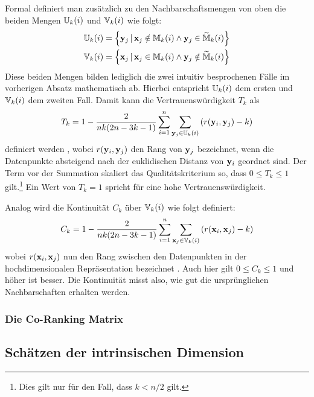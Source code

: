 Formal definiert man zusätzlich zu den Nachbarschaftsmengen von oben die beiden Mengen
$\mathbb{U}_k(i)$ und $\mathbb{V}_k(i)$ wie folgt:
\begin{gather}
	\mathbb{U}_k(i) =  \left\{ \mathbf{y}_j\, |\, \mathbf{x}_j \notin \mathbb{M}_k(i) \land \mathbf{y}_j \in \widetilde{\mathbb{M}}_k(i) \right\} \\
	\mathbb{V}_k(i) =  \left\{ \mathbf{x}_j\, |\, \mathbf{x}_j \in \mathbb{M}_k(i) \land \mathbf{y}_j \notin \widetilde{\mathbb{M}}_k(i) \right\}
\end{gather}
Diese beiden Mengen bilden lediglich die zwei intuitiv besprochenen Fälle im vorherigen Absatz mathematisch ab. Hierbei entspricht $\mathbb{U}_k(i)$ dem ersten und $\mathbb{V}_k(i)$ dem zweiten Fall.
Damit kann die Vertrauenswürdigkeit $T_k$ als
\begin{equation}
	T_k = 1 - \frac{2}{nk(2n - 3k - 1)} \sum_{i = 1}^{n}\sum_{\mathbf{y}_j \in \mathbb{U}_k(i) } \left( r(\mathbf{y}_i, \mathbf{y}_j) - k \right)
\end{equation}
definiert werden \parencite[487]{Venna.2001}, wobei $r(\mathbf{y}_i, \mathbf{y}_j)$ den Rang von $\mathbf{y}_j$ bezeichnet,
wenn die Datenpunkte absteigend nach der euklidischen Distanz von $\mathbf{y}_i$ geordnet sind. Der
Term vor der Summation skaliert das Qualitätskriterium so, dass $0 \leq T_k \leq 1$
gilt.\footnote{Dies gilt nur für den Fall, dass $k < n/2$ gilt.} Ein Wert von $T_k = 1­$ spricht
für eine hohe Vertrauenswürdigkeit.

Analog wird die Kontinuität $C_k$ über $\mathbb{V}_k(i)$ wie folgt definiert:
\begin{equation}
	C_k = 1 - \frac{2}{nk(2n - 3k - 1)} \sum_{i = 1}^{n}\sum_{\mathbf{x}_j \in \mathbb{V}_k(i) } \left( r(\mathbf{x}_i, \mathbf{x}_j) - k \right)
\end{equation}
wobei $r(\mathbf{x}_i, \mathbf{x}_j)$ nun den Rang zwischen den Datenpunkten in der hochdimensionalen Repräsentation bezeichnet \parencite[487]{Venna.2001}. Auch hier gilt $0 \leq C_k \leq 1$ und höher ist besser. Die Kontinuität
misst also, wie gut die ursprünglichen Nachbarschaften erhalten werden.

\subsubsection{Die Co-Ranking Matrix}

\subsection{Schätzen der intrinsischen Dimension}
\label{ch:Vergleich:sec:Methodik:subsec:SchaetzenDerIntrinsischenDim}

